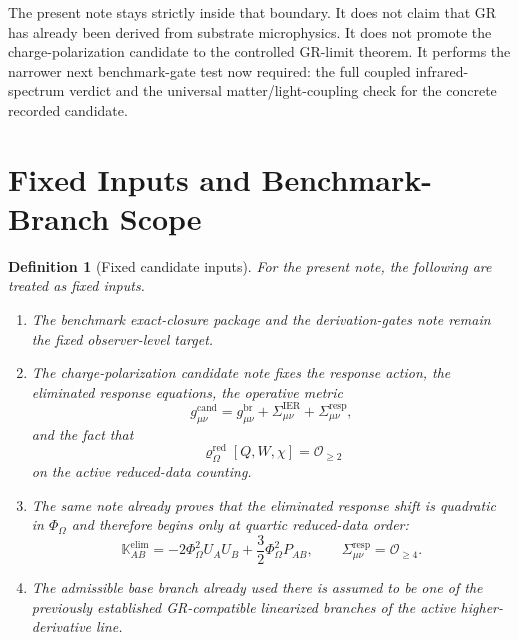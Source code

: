 \documentclass[11pt]{article}
\newcommand{\ProjSub}{P}
\newcommand{\ObserverMetric}{g^{\mathrm{br}}}
\newcommand{\CandidateMetric}{g^{\mathrm{cand}}}
\newcommand{\BaseShift}{\Sigma^{\mathrm{IER}}}
\newcommand{\ResponseShift}{\Sigma^{\mathrm{resp}}}
\newcommand{\AuxPol}{\mathbb K}
\newcommand{\FlowPot}{\Phi_\Omega}
\newcommand{\SourceDensityRed}{\varrho_\Omega^{\mathrm{red}}}
\newtheorem{definition}{Definition}
\begin{document}
The present note stays strictly inside that boundary. It does not claim that GR has already been derived from substrate microphysics. It does not promote the charge-polarization candidate to the controlled GR-limit theorem. It performs the narrower next benchmark-gate test now required: the full coupled infrared-spectrum verdict and the universal matter/light-coupling check for the concrete recorded candidate.

\section{Fixed Inputs and Benchmark-Branch Scope}

\begin{definition}[Fixed candidate inputs]
\label{def:inputs}
For the present note, the following are treated as fixed inputs.
\begin{enumerate}
    \item The benchmark exact-closure package and the derivation-gates note remain the fixed observer-level target.
    \item The charge-polarization candidate note fixes the response action, the eliminated response equations, the operative metric
    \begin{equation}
    \CandidateMetric_{\mu\nu}
    =
    \ObserverMetric_{\mu\nu}
    +\BaseShift_{\mu\nu}
    +\ResponseShift_{\mu\nu},
    \label{eq:gcand}
    \end{equation}
    and the fact that
    \begin{equation}
    \SourceDensityRed[Q,W,\chi]=\mathcal O_{\ge 2}
    \label{eq:rhoorder}
    \end{equation}
    on the active reduced-data counting.
    \item The same note already proves that the eliminated response shift is quadratic in \(\FlowPot\) and therefore begins only at quartic reduced-data order:
    \begin{equation}
    \AuxPol_{AB}^{\mathrm{elim}}
    =
    -2\FlowPot^2 U_AU_B
    +\frac32\FlowPot^2\ProjSub_{AB},
    \qquad
    \ResponseShift_{\mu\nu}=\mathcal O_{\ge 4}.
    \label{eq:resporder}
    \end{equation}
    \item The admissible base branch already used there is assumed to be one of the previously established GR-compatible linearized branches of the active higher-derivative line.
\end{enumerate}
\end{definition}
\end{document}
